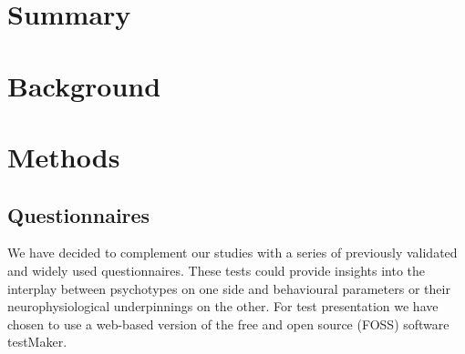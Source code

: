
\chapter{Summary}
\readme
\chapter{Background}
    \section{}
\chapter{Methods}
    \section{Questionnaires}
    We have decided to complement our studies with a series of previously validated and widely used questionnaires.
    These tests could provide insights into the interplay between psychotypes on one side and behavioural parameters or their neurophysiological underpinnings on the other.
    For test presentation we have chosen to use a web-based version of the free and open source (FOSS) software testMaker\cite{testmaker}.
    

